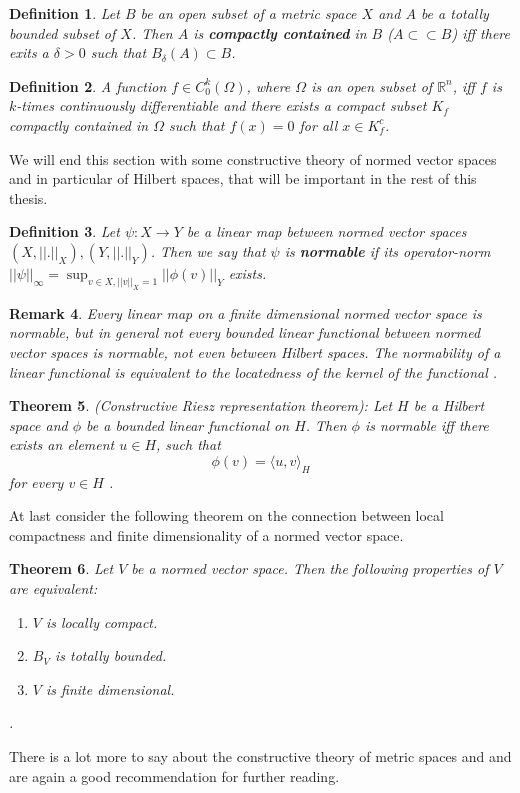 \documentclass[11pt,a4paper,leqno]{report}
\newtheorem{theorem}{Theorem}[chapter]
\newtheorem{definition}[theorem]{Definition}
\newtheorem{remark}[theorem]{Remark}
\numberwithin{equation}{chapter}
\begin{document}
\begin{definition} Let $B$ be an open subset of a metric space $X$ and $A$ be a totally bounded subset of $X$. Then $A$ is \textbf{compactly contained} in $B$ ($A\subset\subset B$) iff there exits a $\delta>0$ such that $B_\delta(A)\subset B$. \end{definition}
\begin{definition}
A function $f\in C^k_0(\Omega)$, where $\Omega$ is an open subset of $\mathbb{R}^n$, iff $f$ is $k$-times continuously differentiable and there exists a compact subset $K_f$ compactly contained in $\Omega$ such that $f(x)=0$ for all $x\in K_f^c$.\end{definition}
We will end this section with some constructive theory of normed vector spaces and in particular of Hilbert spaces, that will be important in the rest of this thesis.
\begin{definition} Let $\psi:X\rightarrow Y$ be a linear map between normed vector spaces $(X,||.||_X), (Y,||.||_Y)$. Then we say that $\psi$ is \textbf{normable} if its operator-norm $||\psi||_\infty=\sup_{v\in X,||v||_X=1}||\phi(v)||_Y$ exists.
\end{definition}
\begin{remark} Every linear map on a finite dimensional normed vector space is normable, but in general not every bounded linear functional between normed vector spaces is normable, not even between Hilbert spaces. The normability of a linear functional is equivalent to the locatedness of the kernel of the functional \cite{VAR}. 
\end{remark}
\begin{theorem}(Constructive Riesz representation theorem): Let $H$ be a Hilbert space and $\phi$ be a bounded linear functional on $H$. Then $\phi$ is normable iff there exists an element $u\in H$, such that
\begin{equation} \phi(v)=\langle u,v\rangle_H\end{equation}
for every $v\in H$ \cite{TCA}.
\end{theorem}
At last consider the following theorem on the connection between local compactness and finite dimensionality of a normed vector space.
\begin{theorem} Let $V$ be a normed vector space. Then the following properties of $V$ are equivalent: 
\begin{enumerate}
\item{$V$ is locally compact.}
\item{$B_V$ is totally bounded.}
\item{$V$ is finite dimensional.}\end{enumerate}
\cite{VAR}.
\end{theorem}
There is a lot more to say about the constructive theory of metric spaces and \cite{CANA} and \cite{VAR} are again a good recommendation for further reading. 
\end{document}
